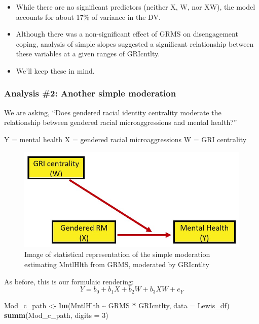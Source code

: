 \documentclass[
  11pt,
]{book}
\newenvironment{Shaded}{\begin{snugshade}}{\end{snugshade}}
\newcommand{\AttributeTok}[1]{\textcolor[rgb]{0.27,0.27,0.27}{#1}}
\newcommand{\DecValTok}[1]{\textcolor[rgb]{0.06,0.06,0.06}{#1}}
\newcommand{\FunctionTok}[1]{\textcolor[rgb]{0.27,0.27,0.27}{\textbf{#1}}}
\newcommand{\NormalTok}[1]{#1}
\newcommand{\OtherTok}[1]{\textcolor[rgb]{0.37,0.37,0.37}{#1}}
\newcommand{\SpecialCharTok}[1]{\textcolor[rgb]{0.43,0.43,0.43}{\textbf{#1}}}
\providecommand{\tightlist}{%
  \setlength{\itemsep}{0pt}\setlength{\parskip}{0pt}}
\begin{document}
\begin{itemize}
\tightlist
\item
  While there are no significant predictors (neither X, W, nor XW), the model accounts for about 17\% of variance in the DV.
\item
  Although there was a non-significant effect of GRMS on disengagement coping, analysis of simple slopes suggested a significant relationship between these variables at a given ranges of GRIcntlty.
\item
  We'll keep these in mind.
\end{itemize}

\hypertarget{analysis-2-another-simple-moderation}{%
\subsubsection{Analysis \#2: Another simple moderation}\label{analysis-2-another-simple-moderation}}

We are asking, ``Does gendered racial identity centrality moderate the relationship between gendered racial microaggressions and mental health?''

Y = mental health X = gendered racial microaggressions W = GRI centrality

\begin{figure}
\centering
\includegraphics{images/ModMed/LewisMod2.jpg}
\caption{Image of statistical representation of the simple moderation estimating MntlHlth from GRMS, moderated by GRIcntlty}
\end{figure}

As before, this is our formulaic rendering:\\
\[Y=b_{0}+b_{1}X+b_{2}W+b_{3}XW+e_{Y}\]

\begin{Shaded}
\begin{Highlighting}[]
\NormalTok{Mod\_c\_path }\OtherTok{\textless{}{-}} \FunctionTok{lm}\NormalTok{(MntlHlth }\SpecialCharTok{\textasciitilde{}}\NormalTok{ GRMS }\SpecialCharTok{*}\NormalTok{ GRIcntlty, }\AttributeTok{data =}\NormalTok{ Lewis\_df)}
\FunctionTok{summ}\NormalTok{(Mod\_c\_path, }\AttributeTok{digits =} \DecValTok{3}\NormalTok{)}
\end{Highlighting}
\end{Shaded}
\end{document}

